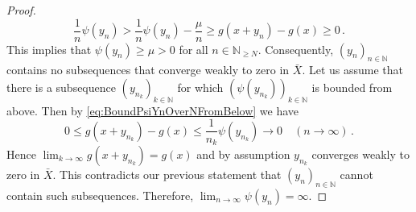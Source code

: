 \documentclass[
	paper=A4,
	pagesize=auto,
	fontsize=12pt
]{scrartcl}
\theoremstyle{plain}
\theoremstyle{remark}
\theoremstyle{definition}
\begin{document}
\begin{proof}
\begin{equation}
\label{eq:BoundPsiYnOverNFromBelow}
\frac{1}{n} \psi \left( y_n \right)
>
\frac{1}{n} \psi \left( y_n \right) -\frac{\mu}{n}
\ge
g \left ( x + y_n \right) - g \left( x \right)
\ge
0 \, .
\end{equation}
%
This implies that $\psi( y_n ) \ge \mu > 0$ for all $n \in \mathbb{N}_{\ge N}$.
Consequently, $(y_n)_{n \in \mathbb{N}}$ contains no subsequences that converge weakly to zero in $\bar{X}$.
Let us assume that there is a subsequence $(y_{n_k})_{k \in \mathbb{N}}$ for which $(\psi (y_{n_k}))_{k \in \mathbb{N}}$ is bounded from above.
Then by \cref{eq:BoundPsiYnOverNFromBelow} we have
%
\begin{equation}
0 
\le
g \left( x + y_{n_k} \right) - g \left( x \right) 
\le
\frac{1}{n_k} \psi \left( y_{n_k} \right) \to 0 \quad (n \to \infty) \, .
\end{equation}
%
Hence $\lim_{k \to \infty} g( x + y_{n_k} ) = g(x)$ and by assumption $y_{n_k}$ converges weakly to zero in $\bar{X}$.
This contradicts our previous statement that $(y_n)_{n \in \mathbb{N}}$ cannot contain such subsequences.
Therefore, $\lim_{n \to \infty} \psi( y_n ) = \infty$.


\end{proof}
\end{document}
